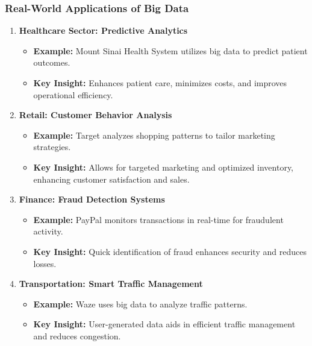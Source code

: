 \documentclass[aspectratio=169]{beamer}
\begin{document}
\begin{frame}[fragile]
    \frametitle{Real-World Applications of Big Data}
    \begin{enumerate}
        \item \textbf{Healthcare Sector: Predictive Analytics}
            \begin{itemize}
                \item \textbf{Example:} Mount Sinai Health System utilizes big data to predict patient outcomes.
                \item \textbf{Key Insight:} Enhances patient care, minimizes costs, and improves operational efficiency.
            \end{itemize}
            
        \item \textbf{Retail: Customer Behavior Analysis}
            \begin{itemize}
                \item \textbf{Example:} Target analyzes shopping patterns to tailor marketing strategies.
                \item \textbf{Key Insight:} Allows for targeted marketing and optimized inventory, enhancing customer satisfaction and sales.
            \end{itemize}
        
        \item \textbf{Finance: Fraud Detection Systems}
            \begin{itemize}
                \item \textbf{Example:} PayPal monitors transactions in real-time for fraudulent activity.
                \item \textbf{Key Insight:} Quick identification of fraud enhances security and reduces losses.
            \end{itemize}
        
        \item \textbf{Transportation: Smart Traffic Management}
            \begin{itemize}
                \item \textbf{Example:} Waze uses big data to analyze traffic patterns.
                \item \textbf{Key Insight:} User-generated data aids in efficient traffic management and reduces congestion.
            \end{itemize}
    \end{enumerate}
\end{frame}
\end{document}
